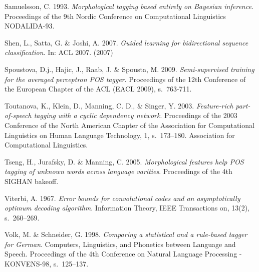 \documentclass[utf8,bachelor,manualbib]{gradu3}
\begin{document}
\begin{thebibliography}{}
Samuelsson, C. 1993. \textit{Morphological tagging based entirely on Bayesian inference}. Proceedings of the 9th Nordic Conference on Computational Linguistics NODALIDA-93.

Shen, L., Satta, G. \& Joshi, A. 2007. \textit{Guided learning for bidirectional sequence classification}. In: ACL 2007. (2007)

Spoustova, D.j., Hajic, J., Raab, J. \& Spousta, M. 2009. \textit{Semi-supervised training for the averaged perceptron POS tagger}. Proceedings of the 12th Conference of the
European Chapter of the ACL (EACL 2009), s.~763-711.

Toutanova, K., Klein, D., Manning, C. D., \& Singer, Y. 2003. \textit{Feature-rich part-of-speech tagging with a cyclic dependency network}. Proceedings of the 2003 Conference of the North American Chapter of the Association for Computational Linguistics on Human Language Technology, 1, s.~173--180. Association for Computational Linguistics.

Tseng, H., Jurafsky, D. \& Manning, C. 2005. \textit{Morphological features help POS tagging of unknown words across language varities}. Proceedings of the 4th SIGHAN bakeoff.

Viterbi, A. 1967. \textit{Error bounds for convolutional codes and an asymptotically optimum decoding algorithm}. Information Theory, IEEE Transactions on, 13(2), s.~260--269.

Volk, M. \& Schneider, G. 1998. \textit{Comparing a statistical and a rule-based tagger for German}. Computers, Linguistics, and Phonetics between Language and Speech. Proceedings
of the 4th Conference on Natural Language Processing - KONVENS-98, s.~125--137.

\end{thebibliography}
\end{document}
